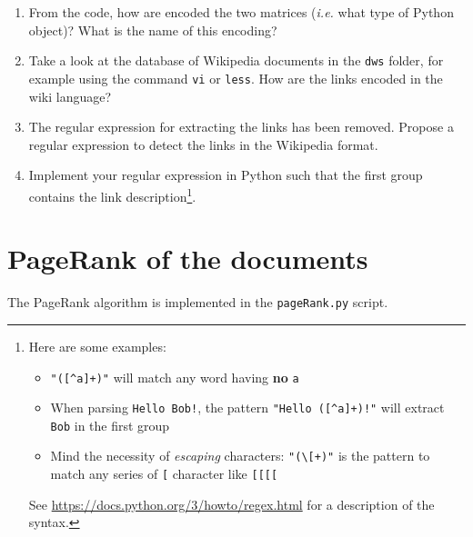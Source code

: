 \documentclass[mathserif, 11pt,c]{article}
\begin{document}
\begin{enumerate}[label=\textbf{Q\thesection.\arabic*}]
	\item From the code, how are encoded the two matrices (\textit{i.e.} what type of Python object)? What is the name of this encoding?
	\item Take a look at the database of Wikipedia documents in the \texttt{dws} folder, for example using the command \texttt{vi} or \texttt{less}. How are the links encoded in the wiki language?
	\item The regular expression for extracting the links has been removed. Propose a regular expression to detect the links in the Wikipedia format.
	\item Implement your regular expression in Python such that the first group contains the link description\footnote{Here are some examples: \begin{itemize}
		\item \texttt{"([\^{}a]+)"} will match any word having \textbf{no} \texttt{a}
		\item When parsing \texttt{Hello Bob!}, the pattern \texttt{"Hello ([\^{}a]+)!"} will extract \texttt{Bob} in the first group 
		\item Mind the necessity of \textit{escaping }characters: \texttt{"(\textbackslash [+)"} is the pattern to match any series of \texttt{[} character like \texttt{[[[[}
	\end{itemize} See \url{https://docs.python.org/3/howto/regex.html} for a description of the syntax.}.
\end{enumerate}


\section{PageRank of the documents}

The PageRank algorithm is implemented in the \texttt{pageRank.py} script.
\end{document}
